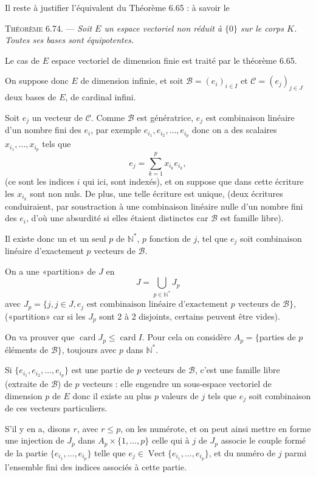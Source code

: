 Il reste à justifier l'équivalent du Théorème 6.65 : à savoir le

\medskip\noindent\textsc{Théorème 6.74.} --- \emph{Soit $E$ un espace vectoriel non réduit à $\{0\}$ sur le corps $K$. Toutes ses bases sont équipotentes.}

Le cas de $E$ espace vectoriel de dimension finie est traité par le théorème 6.65.

On suppose donc $E$ de dimension infinie, et soit $\mathcal B=(e_i)_{i\in I}$ et $\mathcal C=(e_j)_{j\in J}$ deux bases de $E$, de cardinal infini.

Soit $e_j$ un vecteur de $\mathcal C$. Comme $\mathcal B$ est génératrice, $e_j$ est combinaison linéaire d'un nombre fini des $e_i$, par exemple $e_{i_1},e_{i_2},\ldots,e_{i_p}$ donc on a des scalaires $x_{i_1},\ldots,x_{i_p}$ tels que
\[
e_j=\sum_{k=1}^p x_{i_k}e_{i_k},
\]
(ce sont les indices $i$ qui ici, sont indexés), et on suppose que dans cette écriture les $x_{i_k}$ sont non nuls. De plus, une telle écriture est unique, (deux écritures conduiraient, par soustraction à une combinaison linéaire nulle d'un nombre fini des $e_i$, d'où une absurdité si elles étaient distinctes car $\mathcal B$ est famille libre).

Il existe donc un et un seul $p$ de $\mathbb N^*$, $p$ fonction de $j$, tel que $e_j$ soit combinaison linéaire d'exactement $p$ vecteurs de $\mathcal B$.

On a une «partition» de $J$ en
\[
J=\bigcup_{p\in\mathbb N^*}J_p
\]
avec $J_p=\{j,j\in J,e_j\text{ est combinaison linéaire d'exactement $p$ vecteurs de }\mathcal B\}$, («partition» car si les $J_p$ sont 2 à 2 disjoints, certains peuvent être vides).

On va prouver que $\operatorname{card}J_p\le\operatorname{card}I$. Pour cela on considère $A_p=\{$parties de $p$ éléments de $\mathcal B\}$, toujours avec $p$ dans $\mathbb N^*$.

Si $\{e_{i_1},e_{i_2},\ldots,e_{i_p}\}$ est une partie de $p$ vecteurs de $\mathcal B$, c'est une famille libre (extraite de $\mathcal B$) de $p$ vecteurs : elle engendre un sous-espace vectoriel de dimension $p$ de $E$ donc il existe au plus $p$ valeurs de $j$ tels que $e_j$ soit combinaison de ces vecteurs particuliers.

S'il y en a, disons $r$, avec $r\le p$, on les numérote, et on peut ainsi mettre en forme une injection de $J_p$ dans $A_p\times\{1,\ldots,p\}$ celle qui à $j$ de $J_p$ associe le couple formé de la partie $\{e_{i_1},\ldots,e_{i_p}\}$ telle que $e_j\in\operatorname{Vect}\{e_{i_1},\ldots,e_{i_p}\}$, et du numéro de $j$ parmi l'ensemble fini des indices associés à cette partie.

